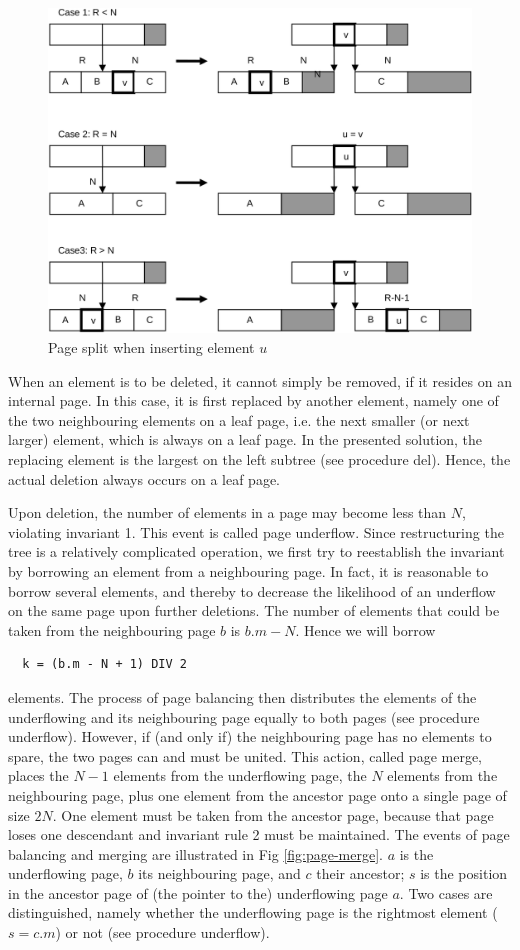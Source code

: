 \begin{figure}
	\label{fig:page-split}
	\centering
	\includegraphics[width=.95\textwidth]{i/o}
	\caption{Page split when inserting element $u$}
\end{figure}
When an element is to be deleted, it cannot simply be removed, if it resides on an internal page.
In this case, it is first replaced by another element, namely one of the two neighbouring elements
on a leaf page, i.e. the next smaller (or next larger) element, which is always on a leaf page. In
the presented solution, the replacing element is the largest on the left subtree (see procedure
del). Hence, the actual deletion always occurs on a leaf page.

Upon deletion, the number of elements in a page may become less than $N$, violating invariant 1.
This event is called page underflow. Since restructuring the tree is a relatively complicated
operation, we first try to reestablish the invariant by borrowing an element from a neighbouring
page. In fact, it is reasonable to borrow several elements, and thereby to decrease the likelihood
of an underflow on the same page upon further deletions. The number of elements that could be
taken from the neighbouring page $b$ is $b.m - N$. Hence we will borrow
\begin{verbatim}
  k = (b.m - N + 1) DIV 2
\end{verbatim}
elements. The process of page balancing then distributes the elements of the underflowing and
its neighbouring page equally to both pages (see procedure underflow).
However, if (and only if) the neighbouring page has no elements to spare, the two pages can and
must be united. This action, called page merge, places the $N-1$ elements from the underflowing
page, the $N$ elements from the neighbouring page, plus one element from the ancestor page onto
a single page of size $2N$. One element must be taken from the ancestor page, because that page
loses one descendant and invariant rule 2 must be maintained. The events of page balancing and
merging are illustrated in Fig \ref{fig:page-merge}. $a$ is the underflowing page, $b$ its neighbouring page, and $c$ their
ancestor; $s$ is the position in the ancestor page of (the pointer to the) underflowing page $a$. Two
cases are distinguished, namely whether the underflowing page is the rightmost element ($s =
c.m$) or not (see procedure underflow).

